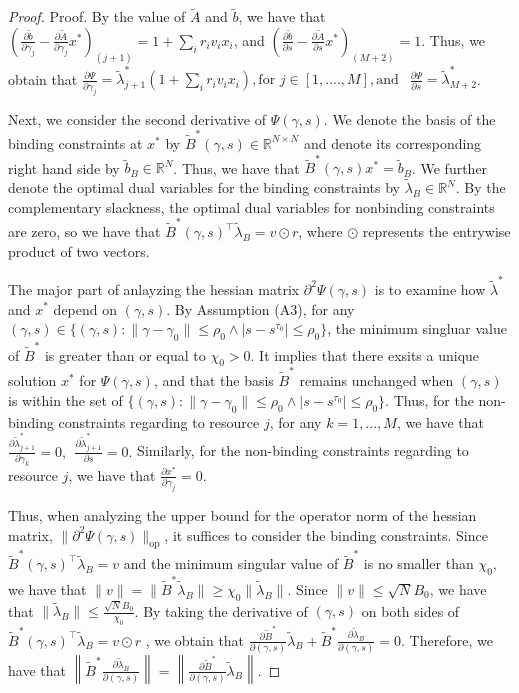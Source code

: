 \documentclass[opre]{informs3aa}
\newcommand{\tlam}{\tilde{\lambda}}
\newcommand{\tB}{\tilde{B}}
\newcommand{\tilb}{\tilde{b}}
\renewcommand{\tilde}{\widetilde}
\renewcommand{\tilde}{\widetilde}
\newcommand{\R}{ \mathbb{R} }
\begin{document}
\begin{appendices}
\begin{proof}{Proof.}
	By the value of $\tilde{A}$ and $\tilde b$, we have that $  \left( \frac{\partial \tilde b}{\partial \gamma_j} - \frac{\partial \tilde{A} }{\partial \gamma_j} x^* \right)_{(j+1)} = 1 + \sum_{i} r_i v_i x_i$, and $ \left( \frac{\partial  \tilde b}{\partial s} - \frac{\partial \tilde{A}}{\partial s} x^* \right)_{(M+2)} = 1$. Thus, we obtain that $
		\frac{\partial \Psi}{\partial \gamma_j} =  \tlam_{j+1}^*(1 +\sum_{i} r_i v_i x_i), \text{for } j \in [1,....,M], \text{and } ~~\frac{\partial \Psi}{\partial s} = \tlam_{M+2}^* $. 
	
	
	
	
	
	
	Next, we consider the second derivative of $\Psi(\gamma, s)$. We denote the basis of the binding constraints at $x^*$ by $\tB^*(\gamma, s) \in \R^{N\times N}$ and denote its corresponding right hand side by $\tilb_B \in \R^{N}$. Thus, we have that $\tB^*(\gamma, s) x^* = \tilb_B$. We further denote the optimal dual variables for the binding constraints by $\tlam_B \in \R^N$. By the complementary slackness, the optimal dual variables for nonbinding constraints are zero, so we have that $\tB^*(\gamma, s)^\top \tlam_B = v \odot r$, where $\odot$ represents the entrywise product of two vectors.
	
	The major part of anlayzing the hessian matrix $\partial^2 \Psi(\gamma,s)$ is to examine how $\tlam^*$ and $x^*$ depend on $(\gamma, s)$. By Assumption (A3), for any $(\gamma,s) \in \{(\gamma,s): \|\gamma - \gamma_0\| \le \rho_0 \wedge |s-s^{\tau_0}|\leq\rho_0  \}$,  the minimum singluar value of $\tB^*$ is greater than or equal to $\chi_0>0$. It implies that there exsits a unique solution $x^*$ for $\Psi(\gamma, s)$, and that the basis $\tB^*$ remains unchanged when $(\gamma, s)$ is within the set of $\{(\gamma,s): \|\gamma - \gamma_0\| \le \rho_0 \wedge |s-s^{\tau_0}|\leq\rho_0  \}$. Thus, for the non-binding constraints regarding to resource $j$, for any $k = 1,...,M$, we have that $ \frac{\partial \tlam^*_{j+1}}{ \partial \gamma_k }  = 0, ~~ \frac{\partial \tlam^*_{j+1}}{ \partial s }  = 0.$
	Similarly, for the non-binding constraints regarding to resource $j$, we have that 
	$ \frac{\partial x^*}{ \partial \gamma_j }  = 0.$
	
	Thus, when analyzing the upper bound for the operator norm of the hessian matrix, $\|\partial^2 \Psi(\gamma,s)\|_{\mathrm{op}}$, it suffices to consider the binding constraints. Since $\tB^*(\gamma, s)^\top \tlam_B = v$ and the minimum singular value of $\tB^*$ is no smaller than $\chi_0$,  we have that $\|v\| = \| \tB^*\tlam_B \| \ge\chi_0  \|\tlam_B\|$. Since $\|v\| \le \sqrt{N}B_0$, we have that $\|\tlam_B\| \le \frac{ \sqrt{N}B_0}{\chi_0}$.
	By taking the derivative of $(\gamma, s)$ on both sides of $\tB^*(\gamma, s)^\top \tlam_B = v\odot r$ , we obtain that $\frac{\partial \tB^*}{ \partial (\gamma, s) } \tlam_B +  \tB^*  \frac{\partial \tlam_B}{ \partial (\gamma, s) } = 0.$ Therefore, we have that $
		\left\| \tB^*  \frac{\partial \tlam_B}{ \partial (\gamma, s) } \right\| = \left\| \frac{\partial \tB^*}{ \partial (\gamma, s) } \tlam_B \right\|.$ 
	

\end{proof}
\end{appendices}
\end{document}
